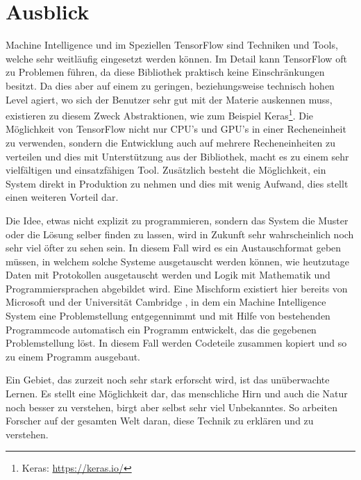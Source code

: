 
\section{Ausblick}

\noindent
Machine Intelligence und im Speziellen TensorFlow sind Techniken und Tools, welche sehr weitläufig eingesetzt werden können. 
Im Detail kann TensorFlow oft zu Problemen führen, da diese Bibliothek praktisch keine Einschränkungen besitzt. 
Da dies aber auf einem zu geringen, beziehungsweise technisch hohen Level agiert, wo sich der Benutzer sehr gut mit der Materie auskennen muss, existieren zu diesem Zweck Abstraktionen, wie zum Beispiel Keras\footnote{Keras: \url{https://keras.io/}}. 
Die Möglichkeit von TensorFlow nicht nur CPU's und GPU's in einer Recheneinheit zu verwenden, sondern die Entwicklung auch auf mehrere Recheneinheiten zu verteilen und dies mit Unterstützung aus der Bibliothek, macht es zu einem sehr vielfältigen und einsatzfähigen Tool. 
Zusätzlich besteht die Möglichkeit, ein System direkt in Produktion zu nehmen und dies mit wenig Aufwand, dies stellt einen weiteren Vorteil dar. \newline

\noindent
Die Idee, etwas nicht explizit zu programmieren, sondern das System die Muster oder die Lösung selber finden zu lassen, wird in Zukunft sehr wahrscheinlich noch sehr viel öfter zu sehen sein. 
In diesem Fall wird es ein Austauschformat geben müssen, in welchem solche Systeme ausgetauscht werden können, wie heutzutage Daten mit Protokollen ausgetauscht werden und Logik mit Mathematik und Programmiersprachen abgebildet wird. 
Eine Mischform existiert hier bereits von Microsoft und der Universität Cambridge \cite{deepcoder-learning-write-programs}, in dem ein Machine Intelligence System eine Problemstellung entgegennimmt und mit Hilfe von bestehenden Programmcode automatisch ein Programm entwickelt, das die gegebenen Problemstellung löst. 
In diesem Fall werden Codeteile zusammen kopiert und so zu einem Programm ausgebaut. \newline

\noindent
Ein Gebiet, das zurzeit noch sehr stark erforscht wird, ist das unüberwachte Lernen. 
Es stellt eine Möglichkeit dar, das menschliche Hirn und auch die Natur noch besser zu verstehen, birgt aber selbst sehr viel Unbekanntes. 
So arbeiten Forscher auf der gesamten Welt daran, diese Technik zu erklären und zu verstehen. 







